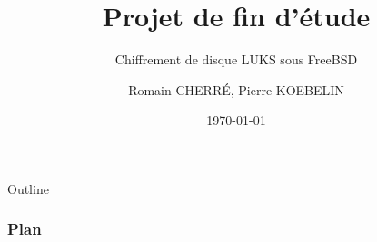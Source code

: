 \documentclass{beamer}
\title[Short title]{Projet de fin d'étude} %
\subtitle{Chiffrement de disque LUKS sous FreeBSD}
\author{Romain CHERRÉ, Pierre KOEBELIN} %
\date{\today} %
\begin{document}
\begin{frame}
  \titlepage %
\end{frame}

\begin{frame}[allowframebreaks]{Outline}
  \frametitle{Plan} %
  \tableofcontents %
\end{frame}













\end{document}

